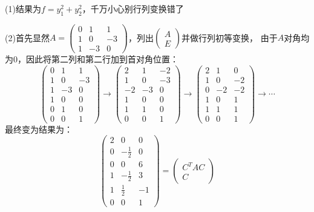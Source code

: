 \begin{solution}
  (1)结果为$f = y_1^2 + y_2^2$，千万小心别行列变换错了
  
  (2)首先显然$A = \left(
    \begin{array}{ccc}
      0&1&1 \\
       1&0&-3 \\
       1&-3&0
    \end{array}
  \right)$，列出$\left(
    \begin{array}{c}
      A\\
      E
    \end{array}
  \right)$并做行列初等变换，
  由于$A$对角均为$0$，因此将第二列和第二行加到首对角位置：
  \begin{equation*}
    \left(
      \begin{array}{ccc}
        0&1&1 \\
         1&0&-3 \\
         1&-3&0 \\
         1&0&0 \\
         0&1&0 \\
         0&0&1
      \end{array}
    \right) \rightarrow \left(
      \begin{array}{ccc}
        2&1&-2 \\
         1&0&-3 \\
         -2&-3&0 \\
         1&0&0 \\
         1&1&0 \\
         0&0&1
      \end{array}
    \right) \rightarrow \left(
      \begin{array}{ccc}
        2&1&0 \\
         1&0&-2 \\
         0&-2&-2 \\
         1&0&1 \\
         1&1&1 \\
         0&0&1
      \end{array}
    \right) \rightarrow \cdots
  \end{equation*}
  最终变为结果为：
  \begin{equation*}
    \left(
      \begin{array}{ccc}
        2&0&0 \\
         0&- \frac{1}{2}&0 \\
         0&0&6 \\
         1&- \frac{1}{2}&3 \\
         1& \frac{1}{2}&-1 \\
         0&0&1
      \end{array}
    \right) = \left(
      \begin{array}{c}
        C^TAC\\
        C
      \end{array}
    \right)
  \end{equation*}
\end{solution}


